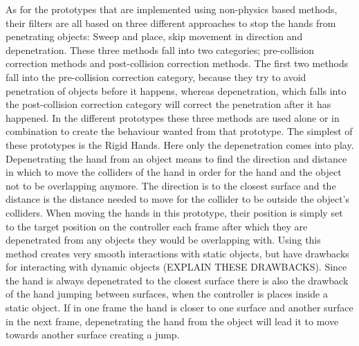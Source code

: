 As for the prototypes that are implemented using non-physics based methods, their filters are all based on three different approaches to stop the hands from penetrating objects: Sweep and place, skip movement in direction and depenetration. These three methods fall into two categories; pre-collision correction methods and post-collision correction methods. The first two methods fall into the pre-collision correction category, because they try to avoid penetration of objects before it happens, whereas depenetration, which falls into the post-collision correction category will correct the penetration after it has happened. In the different prototypes these three methods are used alone or in combination to create the behaviour wanted from that prototype. The simplest of these prototypes is the Rigid Hands. Here only the depenetration comes into play. Depenetrating the hand from an object means to find the direction and distance in which to move the colliders of the hand in order for the hand and the object not to be overlapping anymore. The direction is to the closest surface and the distance is the distance needed to move for the collider to be outside the object's colliders. When moving the hands in this prototype, their position is simply set to the target position on the controller each frame after which they are depenetrated from any objects they would be overlapping with. Using this method creates very smooth interactions with static objects, but have drawbacks for interacting with dynamic objects (EXPLAIN THESE DRAWBACKS). Since the hand is always depenetrated to the closest surface there is also the drawback of the hand jumping between surfaces, when the controller is places inside a static object. If in one frame the hand is closer to one surface and another surface in the next frame, depenetrating the hand from the object will lead it to move towards another surface creating a jump.

